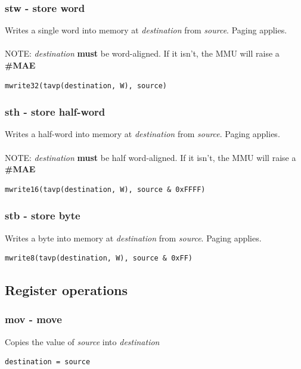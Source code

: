 \documentclass[a4paper,10pt]{article}
\begin{document}
\subsubsection{stw - store word}
	{
		Writes a single word into memory at \emph{destination} from \emph{source}. Paging applies.
		\\\\
		NOTE: \emph{destination} \textbf{must} be word-aligned. If it isn't, the MMU will raise a \textbf{\#MAE}
	}
\begin{lstlisting}
mwrite32(tavp(destination, W), source)
\end{lstlisting}

\subsubsection{sth - store half-word}
	{
		Writes a half-word into memory at \emph{destination} from \emph{source}. Paging applies.
		\\\\
		NOTE: \emph{destination} \textbf{must} be half word-aligned. If it isn't, the MMU will raise a \textbf{\#MAE}
	}
\begin{lstlisting}
mwrite16(tavp(destination, W), source & 0xFFFF)
\end{lstlisting}

\subsubsection{stb - store byte}
	{Writes a byte into memory at \emph{destination} from \emph{source}. Paging applies.}
\begin{lstlisting}
mwrite8(tavp(destination, W), source & 0xFF)
\end{lstlisting}

\subsection{Register operations}
\subsubsection{mov - move}
	{Copies the value of \emph{source} into \emph{destination}}
\begin{lstlisting}
destination = source
\end{lstlisting}
\end{document}
